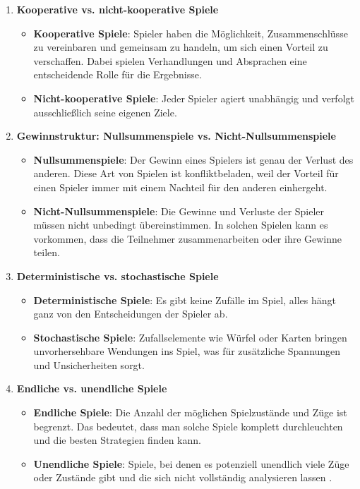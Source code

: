\begin{enumerate}
	\item \textbf{Kooperative vs. nicht-kooperative Spiele}
	\begin{itemize}
		\item \textbf{Kooperative Spiele}: Spieler haben die Möglichkeit, Zusammenschlüsse zu vereinbaren und gemeinsam zu handeln, um sich einen Vorteil zu verschaffen. Dabei spielen Verhandlungen und Absprachen eine entscheidende Rolle für die Ergebnisse.
		\item \textbf{Nicht-kooperative Spiele}: Jeder Spieler agiert unabhängig und verfolgt ausschließlich seine eigenen Ziele.
	\end{itemize}
	
	\item \textbf{Gewinnstruktur: Nullsummenspiele vs. Nicht-Nullsummenspiele}
	\begin{itemize}
		\item \textbf{Nullsummenspiele}: Der Gewinn eines Spielers ist genau der Verlust des anderen. Diese Art von Spielen ist konfliktbeladen, weil der Vorteil für einen Spieler immer mit einem Nachteil für den anderen einhergeht.
		\item \textbf{Nicht-Nullsummenspiele}: Die Gewinne und Verluste der Spieler müssen nicht unbedingt übereinstimmen. In solchen Spielen kann es vorkommen, dass die Teilnehmer zusammenarbeiten oder ihre Gewinne teilen.
	\end{itemize}
	
	\item \textbf{Deterministische vs. stochastische Spiele}
	\begin{itemize}
		\item \textbf{Deterministische Spiele}: Es gibt keine Zufälle im Spiel, alles hängt ganz von den Entscheidungen der Spieler ab.
		\item \textbf{Stochastische Spiele}: Zufallselemente wie Würfel oder Karten bringen unvorhersehbare Wendungen ins Spiel, was für zusätzliche Spannungen und Unsicherheiten sorgt.
	\end{itemize}
	
	\item \textbf{Endliche vs. unendliche Spiele}
	\begin{itemize}
		\item \textbf{Endliche Spiele}: Die Anzahl der möglichen Spielzustände und Züge ist begrenzt. Das bedeutet, dass man solche Spiele komplett durchleuchten und die besten Strategien finden kann.
		\item \textbf{Unendliche Spiele}: Spiele, bei denen es potenziell unendlich viele Züge oder Zustände gibt und die sich nicht vollständig analysieren lassen \autocites{Winter2019}.
	\end{itemize}
\end{enumerate}

